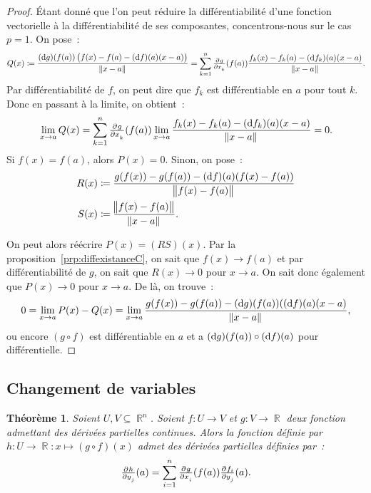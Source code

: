 \documentclass{article}
\DeclareMathOperator{\R}{\mathbb R}
\newtheorem{thm}{Théorème}[section]
\theoremstyle{definition}
\theoremstyle{remark}
\begin{document}
		\begin{proof} Étant donné que l'on peut réduire la différentiabilité d'une fonction vectorielle à la différentiabilité de ses composantes,
		concentrons-nous sur le cas $p=1$. On pose~:
		\[Q(x) \coloneqq \frac {(\dif g)(f(a))\left(f(x)-f(a)-(\dif f)(a)(x-a)\right)}{\norm {x-a}}
		= \sum_{k=1}^n\pd g{x_k}(f(a))\frac{f_k(x)-f_k(a)-(\dif f_k)(a)(x-a)}{\norm{x-a}}.\]
		Par différentiabilité de $f$, on peut dire que $f_k$ est différentiable en $a$ pour tout $k$. Donc en passant à la limite, on obtient~:
		\[\lim_{x \to a}Q(x) = \sum_{k=1}^n\pd g{x_k}(f(a))\lim_{x \to a}\frac {f_k(x)-f_k(a)-(\dif f_k)(a)(x-a)}{\norm{x-a}} = 0.\]
		Si $f(x) = f(a)$, alors $P(x) = 0$. Sinon, on pose~:
		\begin{align*}
			R(x) &\coloneqq \frac {g(f(x)) - g(f(a)) - (\dif f)(a)(f(x)-f(a))}{\norm{f(x)-f(a)}} \\
			S(x) &\coloneqq \frac {\norm{f(x)-f(a)}}{\norm{x-a}}.
		\end{align*}

		On peut alors réécrire $P(x) = (RS)(x)$. Par la proposition~\ref{prp:diffexistanceC}, on sait que $f(x) \to f(a)$ et par différentiabilité de $g$, on
		sait que $R(x) \to 0$ pour $x \to a$. On sait donc également que $P(x) \to 0$ pour $x \to a$. De là, on trouve~:
		\[0 = \lim_{x \to a}P(x)-Q(x) = \lim_{x \to a}\frac {g(f(x)) - g(f(a)) - (\dif g)(f(a))((\dif f)(a)(x-a)}{\norm {x-a}},\]
		ou encore $(g \circ f)$ est différentiable en $a$ et a $(\dif g)(f(a)) \circ (\dif f)(a)$ pour différentielle.
		\end{proof}

	\subsection{Changement de variables}
		\begin{thm} Soient $U, V \subseteq \R^n$. Soient $f : U \to V$ et $g : V \to \R$ deux fonction admettant des dérivées partielles continues.
		Alors la fonction définie par $h : U \to \R : x \mapsto (g \circ f)(x)$ admet des dérivées partielles définies par~:
		\[\pd h{y_j}(a) = \sum_{i=1}^n\pd g{x_i}(f(a))\pd {f_i}{y_j}(a).\]
		\end{thm}
\end{document}
